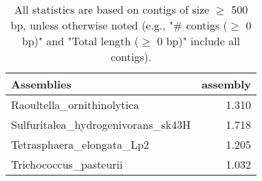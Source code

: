 \documentclass[12pt,a4paper]{article}
\begin{document}
\begin{table}[ht]
\begin{center}
\caption{All statistics are based on contigs of size $\geq$ 500 bp, unless otherwise noted (e.g., "\# contigs ($\geq$ 0 bp)" and "Total length ($\geq$ 0 bp)" include all contigs).}
\begin{tabular}{|l*{1}{|r}|}
\hline
Assemblies & assembly \\ \hline
Raoultella\_ornithinolytica & 1.310 \\ \hline
Sulfuritalea\_hydrogenivorans\_sk43H & 1.718 \\ \hline
Tetrasphaera\_elongata\_Lp2 & 1.205 \\ \hline
Trichococcus\_pasteurii & 1.032 \\ \hline
\end{tabular}
\end{center}
\end{table}
\end{document}
